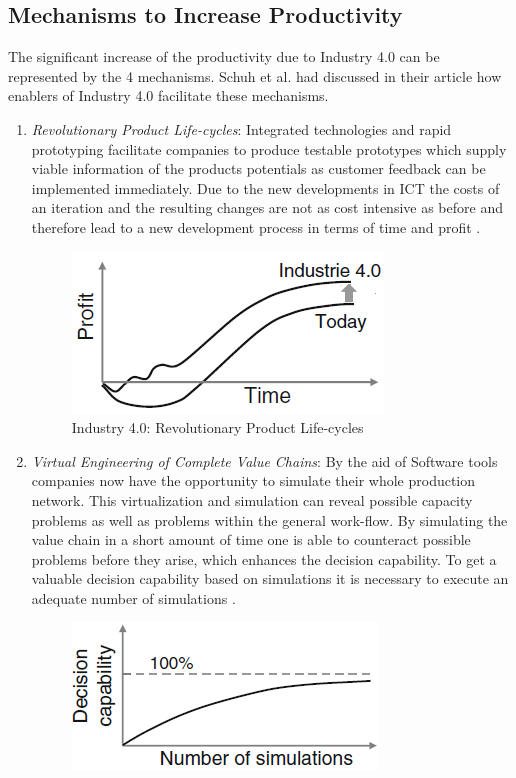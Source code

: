 \subsection{Mechanisms to Increase Productivity}
The significant increase of the productivity due to Industry 4.0 can be represented by the 4 mechanisms. Schuh et al. \cite{IN4HYPO} had discussed in their article how enablers of Industry 4.0 facilitate these mechanisms.
\begin{enumerate}
\item \textit{Revolutionary Product Life-cycles}: Integrated technologies
and rapid prototyping facilitate companies to produce testable prototypes which
supply viable information of the products potentials as customer feedback can be
implemented immediately. Due to the new developments in \acs{ICT} the costs of an iteration and the resulting changes are not as cost intensive as before and therefore lead to a new development process in terms of time and profit  \cite{IN4HYPO}.
\begin{figure}[h!]
\includegraphics[scale=0.5]{./gfx/revlifecycle}
\centering
\caption{Industry 4.0: Revolutionary Product Life-cycles \cite{IN4HYPO}}
\label{fig:2.2}
\end{figure}
\item \textit{Virtual Engineering of Complete Value Chains}: By the aid of Software tools companies now have the opportunity to simulate their whole production network. This virtualization and simulation can reveal possible capacity problems as well as problems within the general work-flow. By simulating the value
chain in a short amount of time one is able to counteract possible problems before
they arise, which enhances the decision capability. To get a valuable decision capability based on simulations	it is necessary to execute an adequate number of simulations  \cite{IN4HYPO}.
\begin{figure}[h!]
\includegraphics[scale=0.5]{./gfx/revsimul}

\end{figure}
\end{enumerate}
